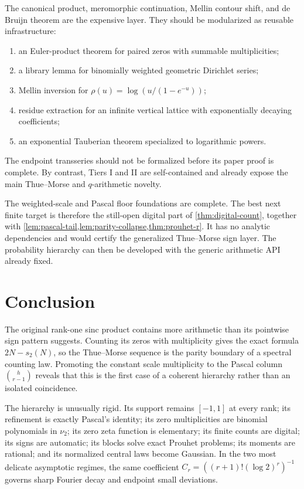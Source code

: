 \documentclass[11pt,a4paper]{article}
\theoremstyle{frontier}
\theoremstyle{definition}
\begin{document}
The canonical product, meromorphic continuation, Mellin contour shift, and de Bruijn theorem are the expensive layer.  They should be modularized as reusable infrastructure:
\begin{enumerate}[label=\textbf{IV.\arabic*}]
\item an Euler-product theorem for paired zeros with summable multiplicities;
\item a library lemma for binomially weighted geometric Dirichlet series;
\item Mellin inversion for $\rho(u)=\log(u/(1-e^{-u}))$;
\item residue extraction for an infinite vertical lattice with exponentially decaying coefficients;
\item an exponential Tauberian theorem specialized to logarithmic powers.
\end{enumerate}
The endpoint transseries should not be formalized before its paper proof is complete.  By contrast, Tiers I and II are self-contained and already expose the main Thue--Morse and $q$-arithmetic novelty.

\begin{statusbox}
The weighted-scale and Pascal floor foundations are complete.  The best next
finite target is therefore the still-open digital part of
\cref{thm:digital-count}, together with
\cref{lem:pascal-tail,lem:parity-collapse,thm:prouhet-r}.  It has no analytic
dependencies and would certify the generalized Thue--Morse sign layer.  The
probability hierarchy can then be developed with the generic arithmetic API
already fixed.
\end{statusbox}

\section{Conclusion}\label{sec:conclusion}

The original rank-one sinc product contains more arithmetic than its pointwise sign pattern suggests.  Counting its zeros with multiplicity gives the exact formula $2N-s_2(N)$, so the Thue--Morse sequence is the parity boundary of a spectral counting law.  Promoting the constant scale multiplicity to the Pascal column $\binom h{r-1}$ reveals that this is the first case of a coherent hierarchy rather than an isolated coincidence.

The hierarchy is unusually rigid.  Its support remains $[-1,1]$ at every rank; its refinement is exactly Pascal's identity; its zero multiplicities are binomial polynomials in $\nu_2$; its zero zeta function is elementary; its finite counts are digital; its signs are automatic; its blocks solve exact Prouhet problems; its moments are rational; and its normalized central laws become Gaussian.  In the two most delicate asymptotic regimes, the same coefficient
$C_r=((r+1)!(\log2)^r)^{-1}$ governs sharp Fourier decay and endpoint small deviations.
\end{document}

